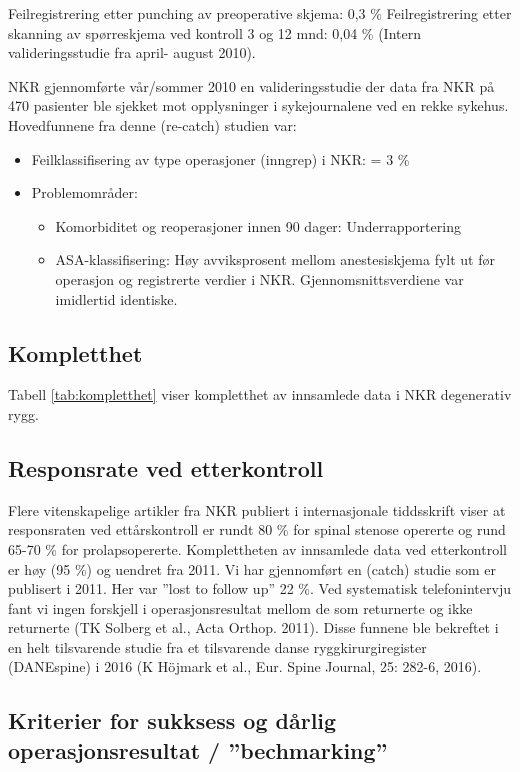 \documentclass[norsk, a4paper, twocolumn]{report}
\begin{document}
Feilregistrering etter punching av preoperative skjema: 0,3 \% 
Feilregistrering etter skanning av spørreskjema ved kontroll 3 og 12 mnd: 0,04 \% 
(Intern valideringsstudie fra april- august 2010).

NKR gjennomførte vår/sommer 2010 en valideringsstudie der data fra NKR på 470 pasienter ble sjekket mot opplysninger i sykejournalene ved en rekke sykehus.  Hovedfunnene fra denne (re-catch) studien var:

\begin{itemize}
\item Feilklassifisering av type operasjoner (inngrep) i NKR: = 3 \%
	\item Problemområder:
\begin{itemize}
		\item Komorbiditet og reoperasjoner innen 90 dager: Underrapportering
		\item ASA-klassifisering: Høy avviksprosent mellom anestesiskjema fylt
        ut før operasjon og registrerte verdier i NKR. Gjennomsnittsverdiene
        var imidlertid identiske.
\end{itemize}
\end{itemize}
\subsection{Kompletthet}

Tabell \ref{tab:kompletthet} viser kompletthet av innsamlede data i NKR degenerativ rygg.

\subsection{Responsrate ved etterkontroll}

Flere vitenskapelige artikler fra NKR publiert i internasjonale tiddsskrift viser at responsraten ved ettårskontroll er rundt 80 \% for spinal stenose opererte og rund 65-70 \% for prolapsopererte. Komplettheten av innsamlede data ved etterkontroll er høy (95 \%) og uendret fra 2011. Vi har gjennomført en (catch) studie som er publisert i 2011. Her var ”lost to follow up” 22 \%. Ved systematisk telefonintervju fant vi ingen forskjell i operasjonsresultat mellom de som returnerte og ikke returnerte (TK Solberg et al., Acta Orthop. 2011). Disse funnene ble bekreftet i en helt tilsvarende studie fra et tilsvarende  danse ryggkirurgiregister (DANEspine) i 2016 (K Höjmark et al., Eur. Spine Journal, 25: 282-6, 2016).


\subsection{Kriterier for sukksess og dårlig operasjonsresultat / ”bechmarking”}
\end{document}
